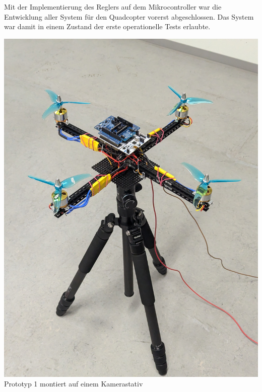 Mit der Implementierung des Reglers auf dem Mikrocontroller war die Entwicklung aller System für den Quadcopter vorerst abgeschlossen. Das System war damit in einem Zustand der erste operationelle Tests erlaubte.
\begin{center}
	\includegraphics[scale=0.1]{../images/0070 Modell 1.jpg}{\\Prototyp 1 montiert auf einem Kamerastativ}
\end{center}


